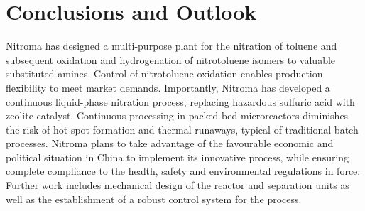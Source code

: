 \section{Conclusions and Outlook}
\label{sec:conclu}
Nitroma has designed a multi-purpose plant for the nitration of toluene and subsequent oxidation and hydrogenation of nitrotoluene isomers to valuable substituted amines.
Control of nitrotoluene oxidation enables production flexibility to meet market demands.
Importantly, Nitroma has developed a continuous liquid-phase nitration process, replacing hazardous sulfuric acid with zeolite catalyst.
Continuous processing in packed-bed microreactors diminishes the risk of hot-spot formation and thermal runaways, typical of traditional batch processes.
Nitroma plans to take advantage of the favourable economic and political situation in China to implement its innovative process, while ensuring complete compliance to the health, safety and environmental regulations in force.
Further work includes mechanical design of the reactor and separation units as well as the establishment of a robust control system for the process.
